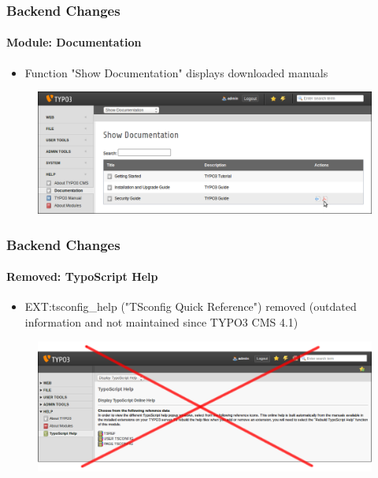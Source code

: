 \begin{frame}[fragile]
	\frametitle{Backend Changes}
	\framesubtitle{Module: Documentation}

	\begin{itemize}
		\item Function "Show Documentation" displays downloaded manuals
	\end{itemize}

	\begin{figure}
		\includegraphics[width=0.95\linewidth]{Images/BackendChanges/ShowDocumentation.png}
	\end{figure}

\end{frame}


\begin{frame}[fragile]
	\frametitle{Backend Changes}
	\framesubtitle{Removed: TypoScript Help}

 	\begin{itemize}
		\item EXT:tsconfig\_help ("TSconfig Quick Reference") removed\newline
			\small(outdated information and not maintained since TYPO3 CMS 4.1)
	\end{itemize}

	\begin{figure}
		\includegraphics[width=0.95\linewidth]{Images/BackendChanges/TypoScriptHelpRemovedCrossed.png}
	\end{figure}

\end{frame}


